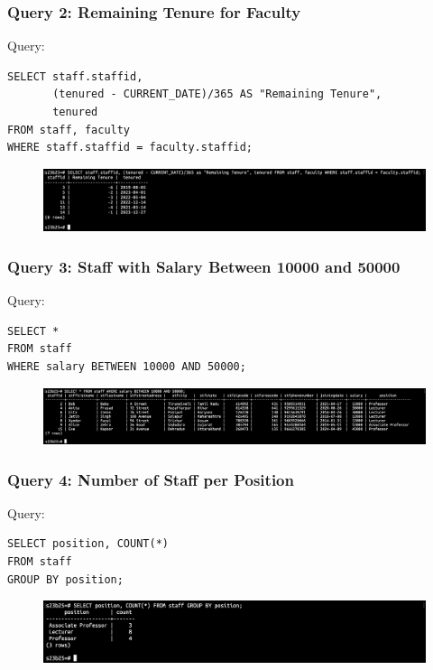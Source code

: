 \documentclass{article}
\begin{document}
\subsubsection*{Query 2: Remaining Tenure for Faculty}
Query:
\begin{Verbatim}[frame=single,framerule=1pt,fontfamily=courier,fontsize=\small]
SELECT staff.staffid, 
       (tenured - CURRENT_DATE)/365 AS "Remaining Tenure", 
       tenured 
FROM staff, faculty 
WHERE staff.staffid = faculty.staffid;
\end{Verbatim}
\begin{figure}[h]
    \centering
    \includegraphics[width=\textwidth]{./o_3.png}
\end{figure}

\subsubsection*{Query 3: Staff with Salary Between 10000 and 50000}
Query:
\begin{Verbatim}[frame=single,framerule=1pt,fontfamily=courier,fontsize=\small]
SELECT * 
FROM staff 
WHERE salary BETWEEN 10000 AND 50000;
\end{Verbatim}
\begin{figure}[h]
    \centering
    \includegraphics[width=\textwidth]{./o_4.png}
\end{figure}

\subsubsection*{Query 4: Number of Staff per Position}
Query:
\begin{Verbatim}[frame=single,framerule=1pt,fontfamily=courier,fontsize=\small]
SELECT position, COUNT(*) 
FROM staff 
GROUP BY position;
\end{Verbatim}
\begin{figure}[h]
    \centering
    \includegraphics[width=\textwidth]{./o_5.png}
\end{figure}
\end{document}
